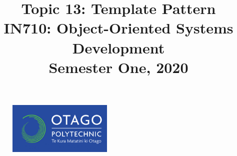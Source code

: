 \documentclass{article}
\author{}
\begin{document}
\begin{figure}
  \includegraphics[width=50mm]{../../resources/img/logo.png}
\end{figure}

\title{Topic 13: Template Pattern\\IN710: Object-Oriented Systems Development\\Semester One, 2020}
\date{}
\maketitle
\end{document}

